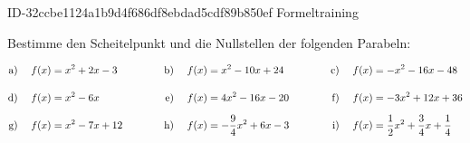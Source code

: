 \begin{exercise}
      {ID-32ccbe1124a1b9d4f686df8ebdad5cdf89b850ef}
      {Formeltraining}
  \ifproblem\problem\par
    Bestimme den Scheitelpunkt und die Nullstellen der folgenden Parabeln:
    \newcommand{\exchar}[1]{\vphantom{\frac{f}{f}}\text{#1}&\;}%
    \begin{alignat*}{8}
      \exchar{a)}
      &
      f(x)&=x^2+2x-3
      &
      \quad&\quad
      &
      \exchar{b)}
      &
      f(x)&=x^2-10x+24
      &
      \quad&\quad
      &
      \exchar{c)}
      &
      f(x)&=-x^2-16x-48
      \\
      \exchar{d)}
      &
      f(x)&=x^2-6x
      &
      \quad&\quad
      &
      \exchar{e)}
      &
      f(x)&=4x^2-16x-20
      &
      \quad&\quad
      &
      \exchar{f)}
      &
      f(x)&=-3x^2+12x+36
      \\
      \exchar{g)}
      &
      f(x)&=x^2-7x+12
      &
      \quad&\quad
      &
      \exchar{h)}
      &
      f(x)&=-\frac{9}{4}x^2+6x-3
      &
      \quad&\quad
      &
      \exchar{i)}
      &
      f(x)&=\frac{1}{2}x^2+\frac{3}{4}x+\frac{1}{4}
    \end{alignat*}
  \fi
\end{exercise}
